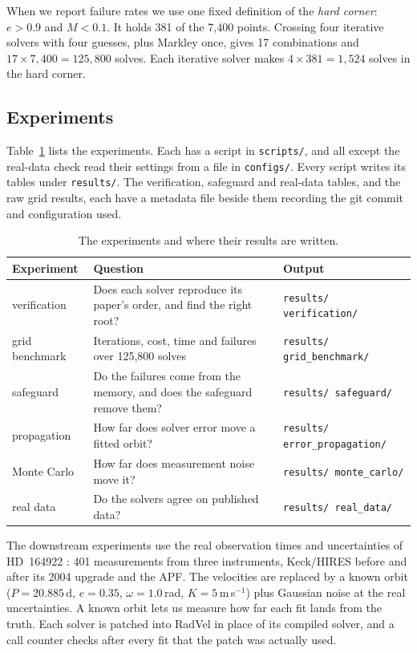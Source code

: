 \documentclass[sigconf,nonacm]{acmart}
\begin{document}
When we report failure rates we use one fixed definition of the
\emph{hard corner}: $e > 0.9$ and $M < 0.1$. It holds 381 of the 7{,}400
points. Crossing four iterative solvers with four guesses, plus Markley
once, gives 17 combinations and $17 \times 7{,}400 = 125{,}800$ solves. Each
iterative solver makes $4 \times 381 = 1{,}524$ solves in the hard corner.

\subsection{Experiments}

Table~\ref{tab:experiments} lists the experiments. Each has a script in
\texttt{scripts/}, and all except the real-data check read their settings
from a file in \texttt{configs/}. Every script writes its tables under
\texttt{results/}. The verification, safeguard and real-data tables, and
the raw grid results, each have a metadata file beside them recording the
git commit and configuration used.

\begin{table}[h]
\centering\small
\caption{The experiments and where their results are written.}
\label{tab:experiments}
\begin{tabular}{@{}p{1.55cm}p{3.7cm}p{2.55cm}@{}}
\toprule
\textbf{Experiment} & \textbf{Question} & \textbf{Output} \\
\midrule
verification   & Does each solver reproduce its paper's order, and find the
                 right root? & \texttt{results/ verification/} \\
grid benchmark & Iterations, cost, time and failures over 125{,}800
                 solves & \texttt{results/ grid\_benchmark/} \\
safeguard      & Do the failures come from the memory, and does the
                 safeguard remove them? & \texttt{results/ safeguard/} \\
propagation    & How far does solver error move a fitted orbit?
               & \texttt{results/ error\_propagation/} \\
Monte Carlo    & How far does measurement noise move it?
               & \texttt{results/ monte\_carlo/} \\
real data      & Do the solvers agree on published data?
               & \texttt{results/ real\_data/} \\
\bottomrule
\end{tabular}
\end{table}

The downstream experiments use the real observation times and
uncertainties of HD~164922 \cite{hd164922}: 401 measurements from three
instruments, Keck/HIRES before and after its 2004 upgrade and the APF.
The velocities are replaced by a known orbit
($P = 20.885$\,d, $e = 0.35$, $\omega = 1.0$\,rad, $K = 5$\,m\,s$^{-1}$)
plus Gaussian noise at the real uncertainties. A known orbit lets us
measure how far each fit lands from the truth. Each solver is patched into
RadVel in place of its compiled solver, and a call counter checks after
every fit that the patch was actually used.
\end{document}
